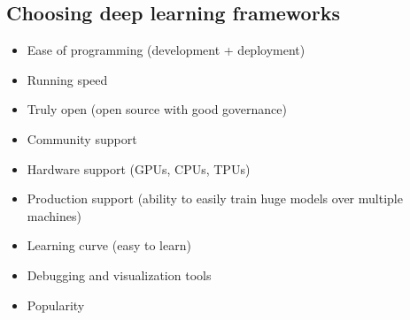 \subsection*{Choosing deep learning frameworks}

\begin{itemize}
    \item Ease of programming (development + deployment)
    \item Running speed
    \item Truly open (open source with good governance)
    \item Community support
    \item Hardware support (GPUs, CPUs, TPUs)
    \item Production support (ability to easily train huge models over multiple machines)
    \item Learning curve (easy to learn)
    \item Debugging and visualization tools
    \item Popularity
\end{itemize}
